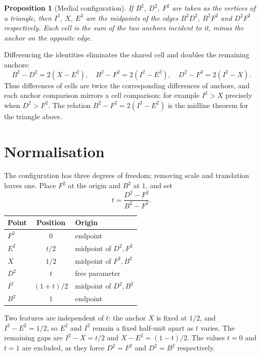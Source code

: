 \documentclass[12pt]{article}
\newtheorem{proposition}[theorem]{Proposition}
\theoremstyle{remark}
\begin{document}
\begin{proposition}[Medial configuration]
If $B^2$, $D^2$, $F^2$ are taken as the vertices of a triangle, then
$I^2$, $X$, $E^2$ are the midpoints of the edges $B^2D^2$, $B^2F^2$ and
$D^2F^2$ respectively. Each cell is the sum of the two anchors incident
to it, minus the anchor on the opposite edge.
\end{proposition}

Differencing the identities eliminates the shared cell and doubles the
remaining anchors:
\[
B^2 - D^2 = 2(X - E^2), \quad
B^2 - F^2 = 2(I^2 - E^2), \quad
D^2 - F^2 = 2(I^2 - X).
\]
Thus differences of cells are twice the corresponding differences of
anchors, and each anchor comparison mirrors a cell comparison: for
example $I^2 > X$ precisely when $D^2 > F^2$. The relation
$B^2 - F^2 = 2(I^2 - E^2)$ is the midline theorem for the triangle
above.

\section{Normalisation}\label{sec:norm}

The configuration has three degrees of freedom; removing scale and
translation leaves one. Place $F^2$ at the origin and $B^2$ at $1$, and
set
\[
t = \frac{D^2 - F^2}{B^2 - F^2}.
\]

\begin{center}
\begin{tabular}{lcl}
\hline
Point & Position & Origin \\
\hline
$F^2$ & $0$       & endpoint \\
$E^2$ & $t/2$     & midpoint of $D^2, F^2$ \\
$X$   & $1/2$     & midpoint of $F^2, B^2$ \\
$D^2$ & $t$       & free parameter \\
$I^2$ & $(1+t)/2$ & midpoint of $D^2, B^2$ \\
$B^2$ & $1$       & endpoint \\
\hline
\end{tabular}
\end{center}

Two features are independent of $t$: the anchor $X$ is fixed at $1/2$,
and $I^2 - E^2 = 1/2$, so $E^2$ and $I^2$ remain a fixed half-unit
apart as $t$ varies. The remaining gaps are $I^2 - X = t/2$ and
$X - E^2 = (1-t)/2$. The values $t = 0$ and $t = 1$ are excluded, as
they force $D^2 = F^2$ and $D^2 = B^2$ respectively.
\end{document}
